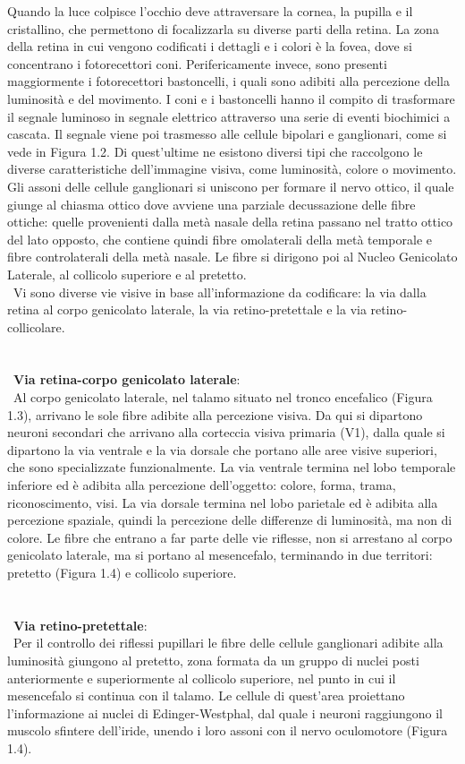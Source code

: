 Quando la luce colpisce l’occhio deve attraversare la cornea, la pupilla e il cristallino, che permettono di focalizzarla su diverse parti della retina. La zona della retina in cui vengono codificati i dettagli e i colori è la fovea, dove si concentrano i fotorecettori coni. Perifericamente invece, sono presenti maggiormente i fotorecettori bastoncelli, i quali sono adibiti alla percezione della luminosità e del movimento. I coni e i bastoncelli hanno il compito di trasformare il segnale luminoso in segnale elettrico attraverso una serie di eventi biochimici a cascata. Il segnale viene poi trasmesso alle cellule bipolari e ganglionari, come si vede in Figura 1.2. Di quest'ultime ne esistono diversi tipi che raccolgono le diverse caratteristiche dell’immagine visiva, come luminosità, colore o movimento. Gli assoni delle cellule ganglionari si uniscono per formare il nervo ottico, il quale giunge al chiasma ottico dove avviene una parziale decussazione delle fibre ottiche: quelle provenienti dalla metà nasale della retina passano nel tratto ottico del lato opposto, che contiene quindi fibre omolaterali della metà temporale e fibre controlaterali della metà nasale. Le fibre si dirigono poi al Nucleo Genicolato Laterale, al collicolo superiore e al pretetto. 
\\\
Vi sono diverse vie visive in base all’informazione da codificare: la via dalla retina al corpo genicolato laterale, la via retino-pretettale e la via retino-collicolare.
\\\ \\\ \\\ 
\textbf{Via retina-corpo genicolato laterale}: 
\\\
Al corpo genicolato laterale, nel talamo situato nel tronco encefalico (Figura 1.3), arrivano le sole fibre adibite alla percezione visiva. Da qui si dipartono neuroni secondari che arrivano alla corteccia visiva primaria (V1), dalla quale si dipartono la via ventrale e la via dorsale che portano alle aree visive superiori, che sono specializzate funzionalmente. La via ventrale termina nel lobo temporale inferiore ed è adibita alla percezione dell’oggetto: colore, forma, trama, riconoscimento, visi. La via dorsale termina nel lobo parietale ed è adibita alla percezione spaziale, quindi la percezione delle differenze di luminosità, ma non di colore.
Le fibre che entrano a far parte delle vie riflesse, non si arrestano al corpo genicolato laterale, ma si portano al mesencefalo, terminando in due territori: pretetto (Figura 1.4) e collicolo superiore.
\\\ \\\ \\\
\textbf{Via retino-pretettale}: 
\\\
Per il controllo dei riflessi pupillari le fibre delle cellule ganglionari adibite alla luminosità giungono al pretetto, zona formata da un gruppo di nuclei posti anteriormente e superiormente al collicolo superiore, nel punto in cui il mesencefalo si continua con il talamo. Le cellule di quest’area proiettano l’informazione ai nuclei di Edinger-Westphal, dal quale i neuroni raggiungono il muscolo sfintere dell’iride, unendo i loro assoni con il nervo oculomotore (Figura 1.4).

